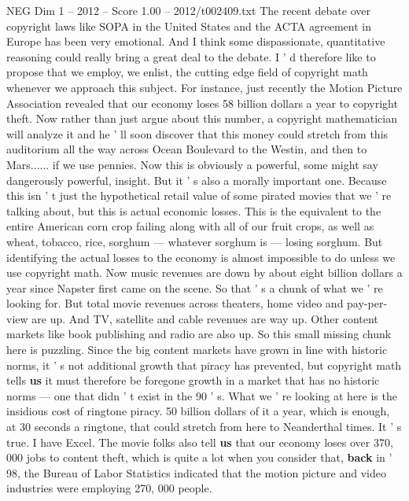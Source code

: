 \begin{textsample}{NEG Dim 1 – 2012 – Score 1.00 – 2012/t002409.txt}  \label{ex:f1_neg_044}
The recent debate over copyright laws like SOPA in the United States and the ACTA agreement in Europe has been very emotional.
And I think some dispassionate, quantitative reasoning could really bring a great deal to the debate.
I ' d therefore like to propose that we employ, we enlist, the cutting edge field of copyright math whenever we approach this subject.
For instance, just recently the Motion Picture Association revealed that our economy loses 58 billion dollars a year to copyright theft.
Now rather than just argue about this number, a copyright mathematician will analyze it and he ' ll soon discover that this money could stretch from this auditorium all the way across Ocean Boulevard to the Westin, and then to Mars...... if we use pennies.
Now this is obviously a powerful, some might say dangerously powerful, insight.
But it ' s also a morally important one.
Because this isn ' t just the hypothetical retail value of some pirated movies that we ' re talking about, but this is actual economic losses.
This is the equivalent to the entire American corn crop failing along with all of our fruit crops, as well as wheat, tobacco, rice, sorghum — whatever sorghum is — losing sorghum.
But identifying the actual losses to the economy is almost impossible to do unless we use copyright math.
Now music revenues are down by about eight billion dollars a year since Napster first came on the scene.
So that ' s a chunk of what we ' re looking for.
But total movie revenues across theaters, home video and pay-per-view are up.
And TV, satellite and cable revenues are way up.
Other content markets like book publishing and radio are also up.
So this small missing chunk here is puzzling.
Since the big content markets have grown in line with historic norms, it ' s not additional growth that piracy has prevented, but copyright math tells \textbf{us} it must therefore be foregone growth in a market that has no historic norms — one that didn ' t exist in the 90 ' s.
What we ' re looking at here is the insidious cost of ringtone piracy. 50 billion dollars of it a year, which is enough, at 30 seconds a ringtone, that could stretch from here to Neanderthal times.
It ' s true.
I have Excel.
The movie folks also tell \textbf{us} that our economy loses over 370, 000 jobs to content theft, which is quite a lot when you consider that, \textbf{back} in ' 98, the Bureau of Labor Statistics indicated that the motion picture and video industries were employing 270, 000 people.

\end{textsample}
